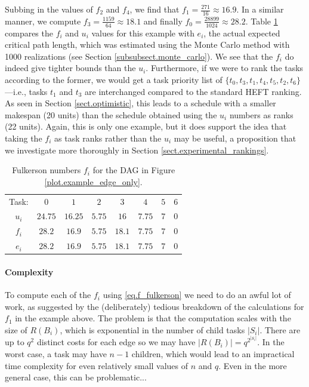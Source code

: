 \documentclass[12pt]{article}
\begin{document}
Subbing in the values of $f_2$ and $f_4$, we find that $f_1 = \frac{271}{16} \approx 16.9$. In a similar manner, we compute $f_3 = \frac{1159}{64} \approx 18.1$ and finally $f_0 = \frac{28899}{1024} \approx 28.2$. Table \ref{tb.fulk_example} compares the $f_i$ and $u_i$ values for this example with $e_i$, the actual expected critical path length, which was estimated using the Monte Carlo method with 1000 realizations (see Section \ref{subsubsect.monte_carlo}). We see that the $f_i$ do indeed give tighter bounds than the $u_i$. Furthermore, if we were to rank the tasks according to the former, we would get a task priority list of $\{t_0, t_3, t_1, t_4, t_5, t_2, t_6\}$---i.e., tasks $t_1$ and $t_3$ are interchanged compared to the standard HEFT ranking. As seen in Section \ref{sect.optimistic}, this leads to a schedule with a smaller makespan (20 units) than the schedule obtained using the $u_i$ numbers as ranks (22 units). Again, this is only one example, but it does support the idea that taking the $f_i$ as task ranks rather than the $u_i$ may be useful, a proposition that we investigate more thoroughly in Section \ref{sect.experimental_rankings}.     

\begin{table}
	\caption{Fulkerson numbers $f_i$ for the DAG in Figure \ref{plot.example_edge_only}.} 
	\begin{center}	
		\begin{tabular}{c c c c c c c c}
			\cmidrule{1-8}
			Task: & $0$ & $1$ & $2$ & $3$ & $4$ & $5$ & $6$\\
			\cmidrule{1-8}
			$u_i$ & $24.75$ & $16.25$ & $5.75$ & $16$ & $7.75$ & $7$ & $0$\\
			$f_i$ & $28.2$ & $16.9$ & $5.75$ & $18.1$ & $7.75$ & $7$ & $0$ \\
			$e_i$ & $28.2$ & $16.9$ & $5.75$ & $18.1$ & $7.75$ & $7$ & $0$ \\
			\bottomrule
		\end{tabular}
		\label{tb.fulk_example}
	\end{center}	
\end{table}

\paragraph{Complexity}
\label{para.fulkerson_computing}

To compute each of the $f_i$ using \eqref{eq.f_fulkerson} we need to do an awful lot of work, as suggested by the (deliberately) tedious breakdown of the calculations for $f_1$ in the example above. The problem is that the computation scales with the size of $R(B_i)$, which is exponential in the number of child tasks $|S_i|$. There are up to $q^2$ distinct costs for each edge so we may have $|R(B_i)| = q^{2^{|S_i|}}$. In the worst case, a task may have $n - 1$ children, which would lead to an impractical time complexity for even relatively small values of $n$ and $q$. Even in the more general case, this can be problematic...  
\end{document}
